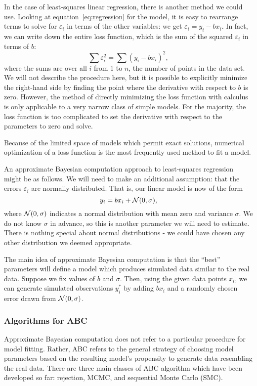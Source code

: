 In the case of least-squares linear regression, there is another method we
could use. Looking at equation~\ref{eq:regression} for the model, it is easy to
rearrange terms to solve for $\varepsilon_i$ in terms of the other variables:
we get $\varepsilon_i = y_i - bx_i$. In fact, we can write down the entire loss
function, which is the sum of the squared $\varepsilon_i$ in terms of $b$:
\[
  \sum \varepsilon_i^2 = \sum (y_i - bx_i)^2,
\]
where the sums are over all $i$ from 1 to $n$, the number of points in the data
set. We will not describe the procedure here, but it is possible to explicitly
minimize the right-hand side by finding the point where the derivative with
respect to $b$ is zero. However, the method of directly minimizing the loss
function with calculus is only applicable to a very narrow class of simple
models. For the majority, the loss function is too complicated to set the
derivative with respect to the parameters to zero and solve.

Because of the limited space of models which permit exact solutions, numerical
optimization of a loss function is the most frequently used method to fit a
model. 

An approximate Bayesian computation approach to least-squares regression might
be as follows. We will need to make an additional assumption: that the errors
$\varepsilon_i$ are normally distributed. That is, our linear model is now of
the form
\[
  y_i = bx_i + \mathcal{N}(0, \sigma),
\]
where $\mathcal{N}(0, \sigma)$ indicates a normal distribution with mean zero and
variance $\sigma$. We do not know $\sigma$ in advance, so this is another
parameter we will need to estimate. There is nothing special about normal
distributions - we could have chosen any other distribution we deemed
appropriate. 

The main idea of approximate Bayesian computation is that the ``best''
parameters will define a model which produces simulated data similar to the
real data. Suppose we fix values of $b$ and $\sigma$. Then, using the given
data points $x_i$, we can generate simulated observations $y_i^*$ by adding
$bx_i$ and a randomly chosen error drawn from $\mathcal{N}(0, \sigma)$.

\subsubsection{Algorithms for ABC}
\label{subsubsec:abcalg}

Approximate Bayesian computation does not refer to a particular procedure for
model fitting. Rather, ABC refers to the general strategy of choosing model
parameters based on the resulting model's propensity to generate data
resembling the real data. There are three main classes of ABC algorithm which
have been developed so far: rejection, \gls{MCMC}, and sequential Monte Carlo
(SMC). 

